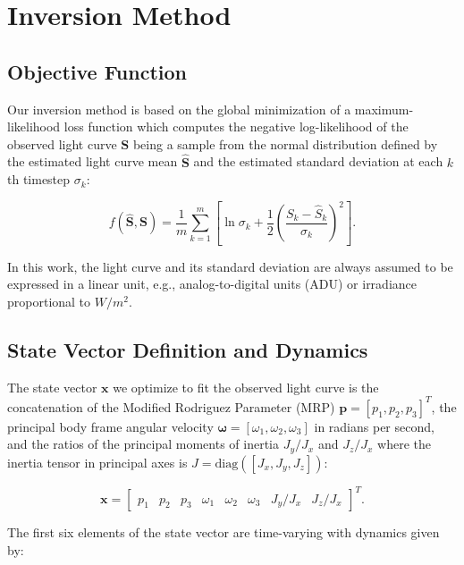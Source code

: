 \documentclass[a4paper,twocolumn]{spaceDebrisC} %
\newcommand{\vctr}[1]{\bm{#1}}
\begin{document}
\FloatBarrier
\section{Inversion Method}

\subsection{Objective Function}

Our inversion method is based on the global minimization of a maximum-likelihood loss function which computes the negative log-likelihood of the observed light curve $\vctr{S}$ being a sample from the normal distribution defined by the estimated light curve mean $\hat{\vctr{S}}$ and the estimated standard deviation at each $k$th timestep $\sigma_k$:

\begin{equation} \label{eq:nll_loss}
 f(\hat{\vctr{S}}, \vctr{S}) = \frac{1}{m}\sum_{k=1}^{m}\left[\ln\sigma_k + \frac{1}{2}\left(\frac{S_k - \hat{S}_k}{\sigma_k}\right)^2 \right].
 \end{equation}

In this work, the light curve and its standard deviation are always assumed to be expressed in a linear unit, e.g., analog-to-digital units (ADU) or irradiance proportional to $W/m^2$.

\subsection{State Vector Definition and Dynamics}

The state vector $\vctr{x}$ we optimize to fit the observed light curve is the concatenation of the Modified Rodriguez Parameter (MRP) $\vctr{p} = [p_1, p_2, p_3]^T$, the principal body frame angular velocity $\vctr{\omega} = [\omega_1, \omega_2, \omega_3]$ in radians per second, and the ratios of the principal moments of inertia $J_y / J_x$ and $J_z / J_x$ where the inertia tensor in principal axes is $J = \mathrm{diag}\left([J_x, J_y, J_z]\right)$:

\begin{equation}
 \vctr{x} = \begin{bmatrix} 
 p_1 & p_2 & p_3 & \omega_1 & \omega_2 & \omega_3 & J_y / J_x & J_z / J_x
  \end{bmatrix}^T.
\end{equation}

The first six elements of the state vector are time-varying with dynamics given by:
\end{document}
